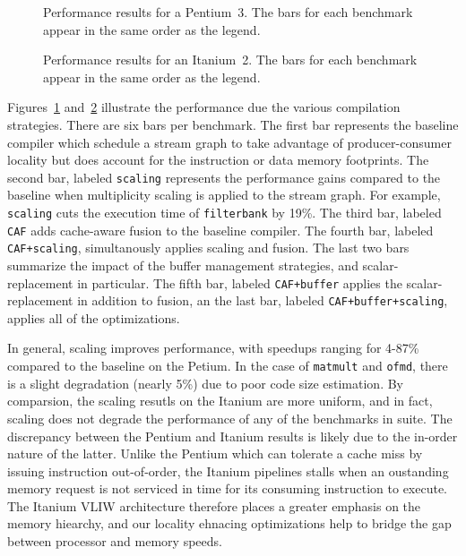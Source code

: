 \begin{figure}[t]
  \vspace{-24pt}
  \hspace{-0.3in}
  \vspace{-48pt}
  \caption{Performance results for a Pentium~3.  The bars for each
  benchmark appear in the same order as the legend.}
  \label{fig:results-p3}
\end{figure}

\begin{figure}[t]
  \vspace{-24pt}
  \hspace{-0.3in}
  \vspace{-48pt}
  \caption{Performance results for an Itanium~2.  The bars for each
  benchmark appear in the same order as the legend.}
  \label{fig:results-ipf}
\end{figure}

Figures~\ref{fig:results-p3} and~\ref{fig:results-ipf} illustrate the
performance due the various compilation strategies. There are six bars
per benchmark. The first bar represents the baseline compiler which
schedule a stream graph to take advantage of producer-consumer
locality but does account for the instruction or data memory
footprints. The second bar, labeled {\tt scaling} represents the
performance gains compared to the baseline when multiplicity scaling
is applied to the stream graph. For example, {\tt scaling} cuts the
execution time of \texttt{filterbank} by 19\%. The third bar, labeled
{\tt CAF} adds cache-aware fusion to the baseline compiler. The fourth
bar, labeled \texttt{CAF+scaling}, simultanously applies scaling and
fusion. The last two bars summarize the impact of the buffer
management strategies, and scalar-replacement in particular. 
The fifth bar, labeled \texttt{CAF+buffer}
applies the scalar-replacement in addition to fusion, an the last bar,
labeled \texttt{CAF+buffer+scaling}, applies all of the optimizations.

In general, scaling improves performance, with speedups ranging for
4-87\% compared to the baseline on the Petium. In the case of
\texttt{matmult} and \texttt{ofmd}, there is a slight degradation
(nearly 5\%) due to poor code size estimation. By comparsion, the
scaling resutls on the 
Itanium are more uniform, and in fact, scaling does not degrade the
performance of any of the benchmarks in suite. The discrepancy between
the Pentium and Itanium results is likely due to the in-order
nature of the latter. Unlike the Pentium which can tolerate a cache
miss by issuing instruction out-of-order, the Itanium pipelines stalls
when an oustanding memory request is not serviced in time for
its consuming instruction to execute. The Itanium VLIW architecture
therefore places a greater emphasis on the memory hiearchy, and our
locality ehnacing optimizations help to bridge the gap between
processor and memory speeds.


